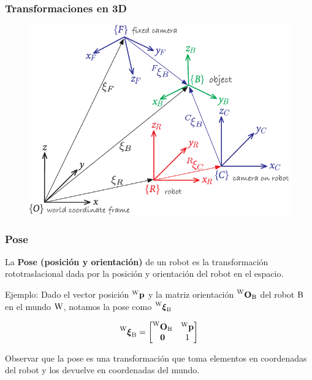 \begin{frame}
    \frametitle{Transformaciones en 3D}
    
    \begin{figure}[!h]
        \includegraphics[width=0.6\columnwidth]{./images/multiple_coordinate_frames_3d.pdf}
    \end{figure}
    
\end{frame}

\begin{frame}
    \frametitle{Pose}
    
    La \textbf{Pose (posición y orientación)} de un robot es la transformación rototraslacional dada por la posición y orientación del robot en el espacio.
    
    Ejemplo: Dado el vector posición $\prescript{\mathrm{\mathrm{W}}}{}{\boldsymbol{\mathbf{p}}}$ y la matriz orientación $\prescript{\mathrm{\mathrm{W}}}{}{{\boldsymbol{\mathbf{O}}}_\mathrm{\mathrm{B}}}$ del robot $\mathrm{B}$ en el mundo $\mathrm{W}$, notamos la pose como $\prescript{\mathrm{\mathrm{W}}}{}{{\boldsymbol{\mathbf{\xi}}}_\mathrm{\mathrm{B}}}$
    
    \begin{equation*}
        \prescript{\mathrm{\mathrm{W}}}{}{{\boldsymbol{\mathbf{\xi}}}_\mathrm{\mathrm{B}}}=
        \begin{bmatrix}
            \prescript{\mathrm{\mathrm{W}}}{}{{\boldsymbol{\mathbf{O}}}_\mathrm{\mathrm{B}}} & \prescript{\mathrm{\mathrm{W}}}{}{\boldsymbol{\mathbf{p}}}\\
            \boldsymbol{\mathbf{0}} & 1
        \end{bmatrix}
    \end{equation*}
    
    Observar que la pose es una transformación que toma elementos en coordenadas del robot y los devuelve en coordenadas del mundo.
\end{frame}


